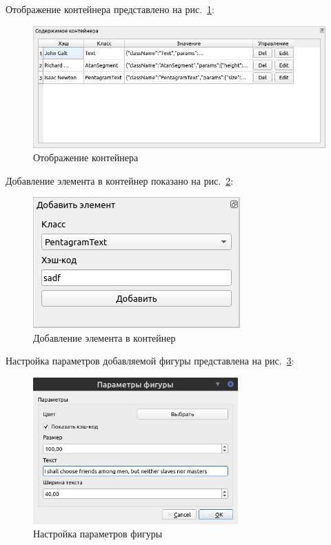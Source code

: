 \documentclass[a4paper, 14pt]{extarticle}
\begin{document}
Отображение контейнера представлено на рис.~\ref{img:qtable}:
\begin{figure}[h]
    \centering
    \includegraphics[width=\textwidth]{img/IMG_001.jpg}
    \caption{Отображение контейнера}%
    \label{img:qtable}
\end{figure}

Добавление элемента в контейнер показано на рис.~\ref{img:addfigure}:
\begin{figure}[h]
    \centering
    \includegraphics{img/IMG_002.jpg}
    \caption{Добавление элемента в контейнер}%
    \label{img:addfigure}
\end{figure}
\FloatBarrier{}

Настройка параметров добавляемой фигуры представлена на рис.~\ref{img:figparams}:
\begin{figure}[h]
    \centering
    \includegraphics[width=0.7\textwidth]{img/IMG_004.jpg}
    \caption{Настройка параметров фигуры}%
    \label{img:figparams}
\end{figure}
\end{document}
